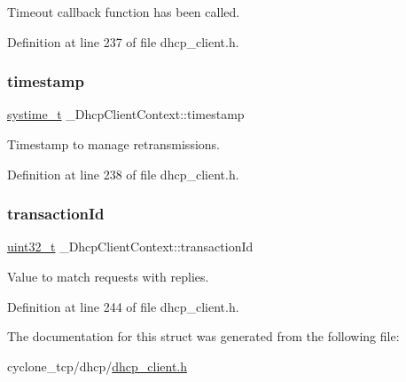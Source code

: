 Timeout callback function has been called. 



Definition at line 237 of file dhcp\+\_\+client.\+h.

\mbox{\label{struct__DhcpClientContext_ad51c6620d753b7322b8f07688b86e8a3}} 
\subsubsection{\texorpdfstring{timestamp}{timestamp}}
{\footnotesize\ttfamily \hyperlink{compiler__port_8h_ae3e32a98d431a02106616da3071832dd}{systime\+\_\+t} \+\_\+\+Dhcp\+Client\+Context\+::timestamp}



Timestamp to manage retransmissions. 



Definition at line 238 of file dhcp\+\_\+client.\+h.

\mbox{\label{struct__DhcpClientContext_aa09dec28d66f3b393f4295582140d8c1}} 
\subsubsection{\texorpdfstring{transaction\+Id}{transactionId}}
{\footnotesize\ttfamily \hyperlink{stdint_8h_a435d1572bf3f880d55459d9805097f62}{uint32\+\_\+t} \+\_\+\+Dhcp\+Client\+Context\+::transaction\+Id}



Value to match requests with replies. 



Definition at line 244 of file dhcp\+\_\+client.\+h.



The documentation for this struct was generated from the following file\+:\begin{DoxyCompactItemize}
\item 
cyclone\+\_\+tcp/dhcp/\hyperlink{dhcp__client_8h}{dhcp\+\_\+client.\+h}\end{DoxyCompactItemize}
